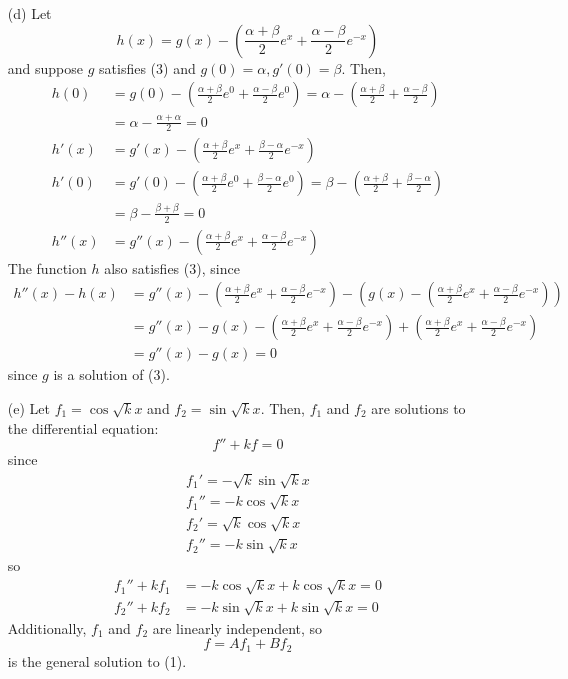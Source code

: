 \documentclass[12pt]{amsart}
\theoremstyle{definition}
\theoremstyle{remark}
\begin{document}
\begin{itemize}
\begin{itemize}
\vspace{0.1 cm}
\item[(d)] Let $$h(x)=g(x)-\left(\frac{\alpha+\beta}{2}e^{x}+ \frac{\alpha-\beta}{2}e^{-x}\right)$$and suppose $g$ satisfies (3) and $g(0)=\alpha,g'(0)=\beta$. Then, \begin{align*}
  h(0)&=g(0)-\left(\frac{\alpha+\beta}{2}e^{0}+ \frac{\alpha-\beta}{2}e^{0}\right)=\alpha-\left(\frac{\alpha+\beta}{2}+ \frac{\alpha-\beta}{2}\right)\\
  &= \alpha-\frac{\alpha+\alpha}{2}=0\\
  h'(x)&= g'(x)-\left(\frac{\alpha+\beta}{2}e^{x}+ \frac{\beta-\alpha}{2}e^{-x}\right)\\
  h'(0)&= g'(0)-\left(\frac{\alpha+\beta}{2}e^{0}+ \frac{\beta-\alpha}{2}e^{0}\right)=\beta-\left(\frac{\alpha+\beta}{2}+ \frac{\beta-\alpha}{2}\right)\\
  &= \beta- \frac{\beta+\beta}{2}=0\\
  h''(x)&= g''(x)-\left(\frac{\alpha+\beta}{2}e^{x}+ \frac{\alpha-\beta}{2}e^{-x}\right)
  \end{align*}The function $h$ also satisfies (3), since \begin{align*}
  h''(x)-h(x)&=g''(x)-\left(\frac{\alpha+\beta}{2}e^{x}+ \frac{\alpha-\beta}{2}e^{-x}\right)-\left(g(x)-\left(\frac{\alpha+\beta}{2}e^{x}+ \frac{\alpha-\beta}{2}e^{-x}\right)\right)\\
  &= g''(x)-g(x)-\left(\frac{\alpha+\beta}{2}e^{x}+ \frac{\alpha-\beta}{2}e^{-x}\right)+\left(\frac{\alpha+\beta}{2}e^{x}+ \frac{\alpha-\beta}{2}e^{-x}\right)\\
  &= g''(x)-g(x)=0
  \end{align*}since $g$ is a solution of (3).

\vspace{0.1 cm}
\item[(e)] Let $f_1=\cos \sqrt{k}x$ and $f_{2}=\sin \sqrt{k}x$. Then, $f_{1}$ and $f_2$ are solutions to the differential equation:
\begin{equation}f''+kf=0\end{equation}since \begin{align*}
f_{1}'=-\sqrt{k}\sin\sqrt{k}x\\
f_{1}''=-k\cos\sqrt{k}x\\
f_{2}'=\sqrt{k}\cos\sqrt{k}x\\
f_{2}''=-k\sin\sqrt{k}x
\end{align*}so\begin{align*}
f_{1}''+kf_1&=-k\cos\sqrt{k}x+k\cos\sqrt{k}x=0\\
f_{2}''+kf_{2}&=-k\sin \sqrt{k}x+k\sin\sqrt{k}x=0
\end{align*}Additionally, $f_1$ and $f_2$ are linearly independent, so $$f=Af_{1}+Bf_{2}$$is the general solution to (1).


\end{itemize}
\end{itemize}
\end{document}

